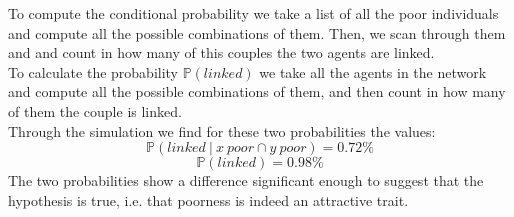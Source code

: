 To compute the conditional probability we take a list of all the poor individuals and compute all the possible combinations of them. Then, we scan through them and and count in how many of this couples the two agents are linked. \\
To calculate the probability $\mathbb{P}(linked)$ we take all the agents in the network and compute all the possible combinations of them, and then count in how many of them the couple is linked. \\
Through the simulation we find for these two probabilities the values:
$$
	\mathbb{P}(linked \ \vert \ x \ poor \cap y \ poor) = 0.72\%
$$
$$
	\mathbb{P}(linked) = 0.98\%
$$
The two probabilities show a difference significant enough to suggest that the hypothesis is true, i.e. that poorness is indeed an attractive trait.
